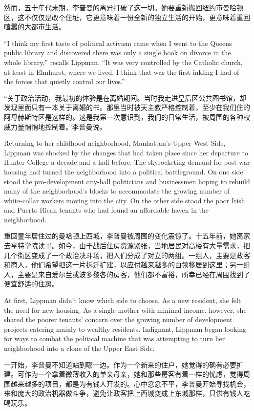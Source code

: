 \ifdefined\chs
然而，五十年代末期，李普曼的离异打破了这一切。她要重新搬回纽约市曼哈顿区，这不仅仅是改个住址，它更意味着一份全新的独立生活的开始，更意味着重回喧嚣的大都市生活。
\fi

\ifdefined\eng
``I think my first taste of political activism came when I went to the Queens public library and discovered there was only a single book on divorce in the whole library,'' recalls Lippman. ``It was very controlled by the Catholic church, at least in Elmhurst, where we lived. I think that was the first inkling I had of the forces that quietly control our lives.''
\fi

\ifdefined\chs
``关于政治活动，我最初的体验是在离婚期间。当时我走进皇后区公共图书馆，却发现里面只有一本关于离婚的书。那里当时被天主教严格控制着，至少在我们住的阿母赫斯特区是这样的。这是我第一次意识到，我们的日常生活，被周围的各种权威力量悄悄地控制着。''李普曼说。
\fi

\ifdefined\eng
Returning to her childhood neighborhood, Manhattan's Upper West Side, Lippman was shocked by the changes that had taken place since her departure to Hunter College a decade and a half before. The skyrocketing demand for post-war housing had turned the neighborhood into a political battleground. On one side stood the pro-development city-hall politicians and businessmen hoping to rebuild many of the neighborhood's blocks to accommodate the growing number of white-collar workers moving into the city. On the other side stood the poor Irish and Puerto Rican tenants who had found an affordable haven in the neighborhood.
\fi

\ifdefined\chs
重回童年居住过的曼哈顿上西城，李普曼被周围的变化震惊了。十五年前，她离家去亨特学院读书。如今，由于战后住房资源紧张，当地居民对高楼有大量需求，把几个街区变成了一个政治决斗场，把人们分成了对立的两组。一组人，主要是政客和商人，他们希望把这一片拆迁扩建，以应付越来越多的白领移居到这里；另一组人，主要是来自爱尔兰或波多黎各的房客，他们都不富裕，所幸已经在周围找到了便宜舒适的住房。
\fi

\ifdefined\eng
At first, Lippman didn't know which side to choose. As a new resident, she felt the need for new housing. As a single mother with minimal income, however, she shared the poorer tenants' concern over the growing number of development projects catering mainly to wealthy residents. Indignant, Lippman began looking for ways to combat the political machine that was attempting to turn her neighborhood into a clone of the Upper East Side.
\fi

\ifdefined\chs
一开始，李普曼不知道站到哪一边。作为一个新来的住户，她觉得的确有必要扩建。可作为一个拿着微薄收入的单亲母亲，她和那些房客有着一样的忧虑，觉得周围越来越多的项目，都是为有钱人开发的。心中忿忿不平，李普曼开始寻找机会，来和庞大的政治机器做斗争，避免让政客把上西城变成上东城那样，只供有钱人吃喝玩乐。
\fi


